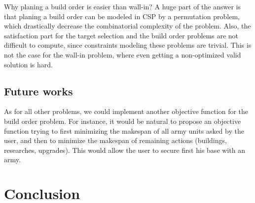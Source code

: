 \documentclass[journal]{IEEEtran}
\newcommand{\csp}{\textsc{CSP}\xspace}
\begin{document}
Why planing a build  order is easier than wall-in? A  huge part of the
answer is  that planing  a build  order can  be modeled  in \csp  by a
permutation  problem,  which  drastically decrease  the  combinatorial
complexity of the problem. Also,  the satisfaction part for the target
selection and the  build order problems are not  difficult to compute,
since constraints  modeling these problems  are trivial.  This  is not
the case for  the wall-in problem, where even  getting a non-optimized
valid solution is hard. 

\subsection{Future works}

As  for  all other  problems,  we  could implement  another  objective
function  for the  build  order  problem. For  instance,  it would  be
natural to  propose an objective  function trying to  first minimizing
the makespan of all army units asked by the user, and then to minimize
the   makespan   of    remaining   actions   (buildings,   researches,
upgrades). This would allow the user  to secure first his base with an
army.

\section{Conclusion}\label{sec:conclusion}








\ifCLASSOPTIONcaptionsoff
  \newpage
\fi

                                                    


\end{document}
